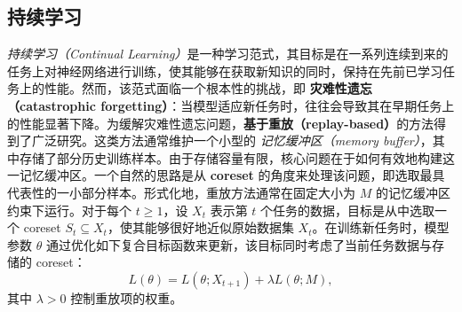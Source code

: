 \documentclass[lang=cn,newtx,10pt,scheme=chinese,chinesefont=nofont,citestyle=gb7714-2015, bibstyle=gb7714-2015]{elegantbook}
\begin{document}
\begin{refsection}
\subsection{持续学习}

\emph{持续学习（Continual Learning）}是一种学习范式，其目标是在一系列连续到来的任务上对神经网络进行训练，使其能够在获取新知识的同时，保持在先前已学习任务上的性能。然而，该范式面临一个根本性的挑战，即 \textbf{灾难性遗忘（catastrophic forgetting）}：当模型适应新任务时，往往会导致其在早期任务上的性能显著下降。为缓解灾难性遗忘问题，\textbf{基于重放（replay-based）}的方法得到了广泛研究。这类方法通常维护一个小型的 \emph{记忆缓冲区（memory buffer）}，其中存储了部分历史训练样本。由于存储容量有限，核心问题在于如何有效地构建这一记忆缓冲区。一个自然的思路是从 \textbf{coreset} 的角度来处理该问题，即选取最具代表性的一小部分样本。形式化地，重放方法通常在固定大小为 $M$ 的记忆缓冲区约束下运行。对于每个 $t \geq 1$，设 $X_t$ 表示第 $t$ 个任务的数据，目标是从中选取一个 coreset $S_t \subseteq X_t$，使其能够很好地近似原始数据集 $X_t$。在训练新任务时，模型参数 $\theta$ 通过优化如下复合目标函数来更新，该目标同时考虑了当前任务数据与存储的 coreset：
\begin{equation}
\label{eq:continual-object-cn}
    L(\theta) = L(\theta; X_{t+1}) + \lambda L(\theta; M),
\end{equation}
其中 $\lambda > 0$ 控制重放项的权重。


\end{refsection}
\end{document}
